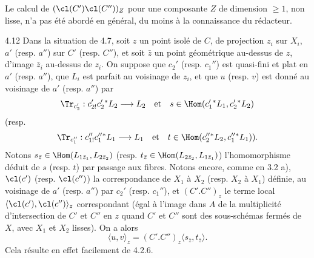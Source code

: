 Le calcul de $(\cl(C')\cl(C''))_Z$ pour une composante $Z$ de dimension $\geq 1$, non lisse, n'a pas été abordé en général, du moins à la connaissance du rédacteur.

\begin{statement}{4.12}
Dans la situation de 4.7, soit $z$ un point isolé de $C$, de projection $z_i$ sur $X_i$, $a'$ (resp. $a''$) sur $C'$ (resp. $C''$), et soit $\bar z$ un point géométrique au-dessus de $z$, d'image $\bar z_i$ au-dessus de $z_i$. On suppose que $c_2'$ (resp. $c_1''$) est quasi-fini et plat en $a'$ (resp. $a''$), que $L_i$ est parfait au voisinage de $z_i$, et que $u$ (resp. $v$) est donné au voisinage de $a'$ (resp. $a''$) par
\[
\Tr_{c_2'}:c_{2!}'c_2'{}^*L_2\longrightarrow L_2
\quad\text{et}\quad
s\in\Hom(c_1'{}^*L_1,c_2'{}^*L_2)
\]
(resp.
\[
\Tr_{c_1''}:c_{1!}''c_1''{}^*L_1\longrightarrow L_1
\quad\text{et}\quad
t\in\Hom(c_2''{}^*L_2,c_1''{}^*L_1)).
\]
Notons $s_{\bar z}\in\Hom(L_{1\bar z_1},L_{2\bar z_2})$ (resp. $t_{\bar z}\in\Hom(L_{2\bar z_2},L_{1\bar z_1})$) l'homomorphisme déduit de $s$ (resp. $t$) par passage aux fibres. Notons encore, comme en 3.2 a), $\cl(c')$ (resp. $\cl(c'')$) la correspondance de $X_1$ à $X_2$ (resp. $X_2$ à $X_1$) définie, au voisinage de $a'$ (resp. $a''$) par $c_2'$ (resp. $c_1''$), et $(C'.C'')_z$ le terme local $\langle\cl(c'),\cl(c'')\rangle_z$ correspondant (égal à l'image dans $A$ de la
multiplicité d'intersection de $C'$ et $C''$ en $z$ quand $C'$ et $C''$ sont des sous-schémas fermés de $X$, avec $X_1$ et $X_2$ lisses). On a alors
\begin{equation}
\tag{4.12.1}
\langle u,v\rangle_z=(C'.C'')_z\langle s_{\bar z},t_{\bar z}\rangle.
\end{equation}
Cela résulte en effet facilement de 4.2.6.
\end{statement}

